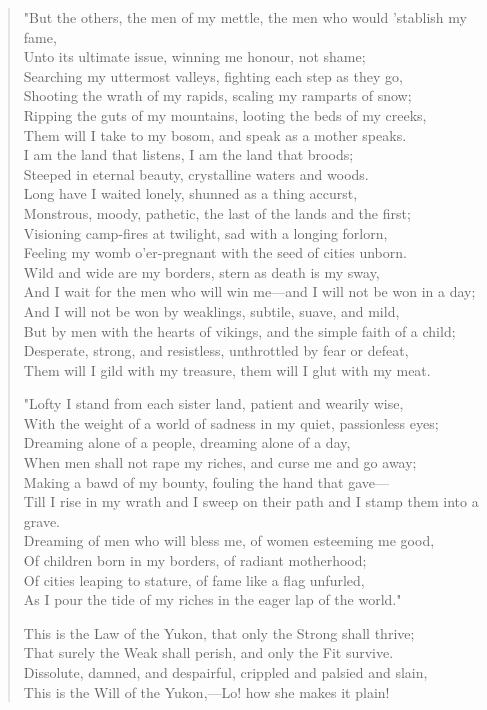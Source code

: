 \begin{verse}
"But the others, the men of my mettle, the men who would 'stablish my fame,\\
Unto its ultimate issue, winning me honour, not shame;\\
Searching my uttermost valleys, fighting each step as they go,\\
Shooting the wrath of my rapids, scaling my ramparts of snow;\\
Ripping the guts of my mountains, looting the beds of my creeks,\\
Them will I take to my bosom, and speak as a mother speaks.\\
I am the land that listens, I am the land that broods;\\
Steeped in eternal beauty, crystalline waters and woods.\\
Long have I waited lonely, shunned as a thing accurst,\\
Monstrous, moody, pathetic, the last of the lands and the first;\\
Visioning camp-fires at twilight, sad with a longing forlorn,\\
Feeling my womb o'er-pregnant with the seed of cities unborn.\\
Wild and wide are my borders, stern as death is my sway,\\
And I wait for the men who will win me—and I will not be won in a day;\\
And I will not be won by weaklings, subtile, suave, and mild,\\
But by men with the hearts of vikings, and the simple faith of a child;\\
Desperate, strong, and resistless, unthrottled by fear or defeat,\\
Them will I gild with my treasure, them will I glut with my meat.

"Lofty I stand from each sister land, patient and wearily wise,\\
With the weight of a world of sadness in my quiet, passionless eyes;\\
Dreaming alone of a people, dreaming alone of a day,\\
When men shall not rape my riches, and curse me and go away;\\
Making a bawd of my bounty, fouling the hand that gave—\\
Till I rise in my wrath and I sweep on their path and I stamp them into a grave.\\
Dreaming of men who will bless me, of women esteeming me good,\\
Of children born in my borders, of radiant motherhood;\\
Of cities leaping to stature, of fame like a flag unfurled,\\
As I pour the tide of my riches in the eager lap of the world."

This is the Law of the Yukon, that only the Strong shall thrive;\\
That surely the Weak shall perish, and only the Fit survive.\\
Dissolute, damned, and despairful, crippled and palsied and slain,\\
This is the Will of the Yukon,—Lo! how she makes it plain!\\
\end{verse}